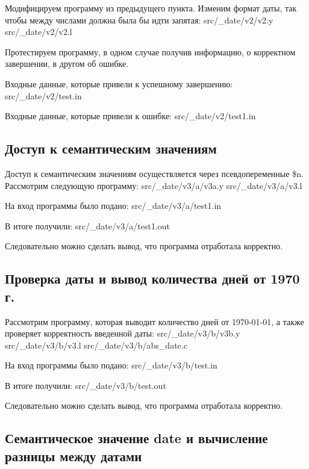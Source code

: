     Модифицируем программу из предыдущего пункта. Изменим формат даты, так чтобы между числами
    должна была бы идти запятая:
     {src/_date/v2/v2.y}
     {src/_date/v2/v2.l}

    Протестируем программу, в одном случае получив информацию,
    о корректном завершении, в другом об ошибке.

    Входные данные, которые привели к успешному завершению:
     {src/_date/v2/test.in}

    Входные данные, которые привели к ошибке:
     {src/_date/v2/test1.in}


\subsection{Доступ к семантическим значениям}

    Доступ к семантическим значениям осуществляется через псевдопеременные \$n.
    Рассмотрим следующую программу:
     {src/_date/v3/a/v3a.y}
     {src/_date/v3/a/v3.l}

    На вход программы было подано:
     {src/_date/v3/a/test1.in}

    В итоге получили:
     {src/_date/v3/a/test1.out}

    Следовательно можно сделать вывод, что программа отработала корректно.


\subsection{Проверка даты и вывод количества дней от 1970 г.}

    Рассмотрим программу, которая выводит количество дней от 1970-01-01,
    а также проверяет корректность введенной даты:
     {src/_date/v3/b/v3b.y}
     {src/_date/v3/b/v3.l}
     {src/_date/v3/b/abs_date.c}

    На вход программы было подано:
     {src/_date/v3/b/test.in}

    В итоге получили:
     {src/_date/v3/b/test.out}

    Следовательно можно сделать вывод, что программа отработала корректно.


\subsection{Семантическое значение date и вычисление разницы между датами}

